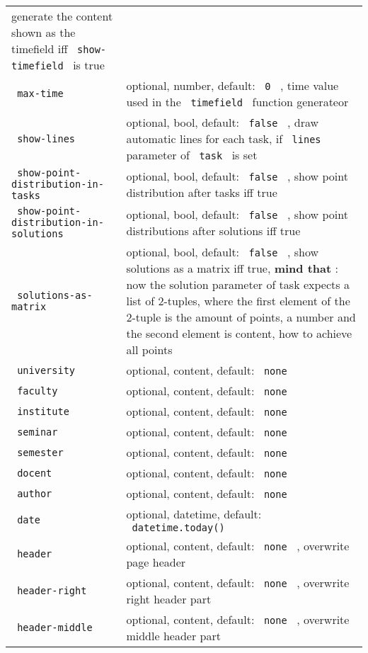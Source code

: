 \begin{longtable}[]{@{}ll@{}}
generate the content shown as the timefield iff
\texttt{\ show-timefield\ } is true \\
\texttt{\ max-time\ } & optional, number, default: \texttt{\ 0\ } , time
value used in the \texttt{\ timefield\ } function generateor \\
\texttt{\ show-lines\ } & optional, bool, default: \texttt{\ false\ } ,
draw automatic lines for each task, if \texttt{\ lines\ } parameter of
\texttt{\ task\ } is set \\
\texttt{\ show-point-distribution-in-tasks\ } & optional, bool, default:
\texttt{\ false\ } , show point distribution after tasks iff true \\
\texttt{\ show-point-distribution-in-solutions\ } & optional, bool,
default: \texttt{\ false\ } , show point distributions after solutions
iff true \\
\texttt{\ solutions-as-matrix\ } & optional, bool, default:
\texttt{\ false\ } , show solutions as a matrix iff true, \textbf{mind
that} : now the solution parameter of task expects a list of 2-tuples,
where the first element of the 2-tuple is the amount of points, a number
and the second element is content, how to achieve all points \\
\texttt{\ university\ } & optional, content, default:
\texttt{\ none\ } \\
\texttt{\ faculty\ } & optional, content, default: \texttt{\ none\ } \\
\texttt{\ institute\ } & optional, content, default:
\texttt{\ none\ } \\
\texttt{\ seminar\ } & optional, content, default: \texttt{\ none\ } \\
\texttt{\ semester\ } & optional, content, default: \texttt{\ none\ } \\
\texttt{\ docent\ } & optional, content, default: \texttt{\ none\ } \\
\texttt{\ author\ } & optional, content, default: \texttt{\ none\ } \\
\texttt{\ date\ } & optional, datetime, default:
\texttt{\ datetime.today()\ } \\
\texttt{\ header\ } & optional, content, default: \texttt{\ none\ } ,
overwrite page header \\
\texttt{\ header-right\ } & optional, content, default:
\texttt{\ none\ } , overwrite right header part \\
\texttt{\ header-middle\ } & optional, content, default:
\texttt{\ none\ } , overwrite middle header part \\

\end{longtable}
